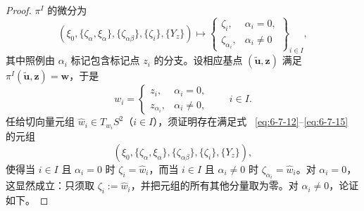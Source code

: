 \begin{proof}
$\pi^I$ 的微分为
\[
  (\xi_0,\{\zeta_\alpha,\xi_\alpha\},\{\zeta_{\alpha\beta}\},
    \{\zeta_i\},\{Y_z\})
  \longmapsto
  \left\{\begin{array}{ll}
    \zeta_i,&\alpha_i=0,\\
    \zeta_{\alpha_i},&\alpha_i\ne0
  \end{array}\right\}_{i\in I},
\]
其中照例由 $\alpha_i$ 标记包含标记点 $z_i$ 的分支。设相应基点
$(\widetilde{\mathbf u},\mathbf z)$ 满足
$\pi^I(\widetilde{\mathbf u},\mathbf z)=\mathbf w$，于是
\[
  w_i=\begin{cases}
    z_i,&\alpha_i=0,\\
    z_{\alpha_i},&\alpha_i\ne0,
  \end{cases}
  \qquad i\in I.
\]
任给切向量元组 $\widehat w_i\in T_{w_i}S^2$（$i\in I$），须证明存在满足式
~\eqref{eq:6-7-12}--\eqref{eq:6-7-15} 的元组
\[
  (\xi_0,\{\zeta_\alpha,\xi_\alpha\},\{\zeta_{\alpha\beta}\},
  \{\zeta_i\},\{Y_z\}),
\]
使得当 $i\in I$ 且 $\alpha_i=0$ 时
$\zeta_i=\widehat w_i$，而当 $i\in I$ 且 $\alpha_i\ne0$ 时
$\zeta_{\alpha_i}=\widehat w_i$。对 $\alpha_i=0$，这显然成立：只须取
$\zeta_i:=\widehat w_i$，并把元组的所有其他分量取为零。对 $\alpha_i\ne0$，论证如下。


\end{proof}
